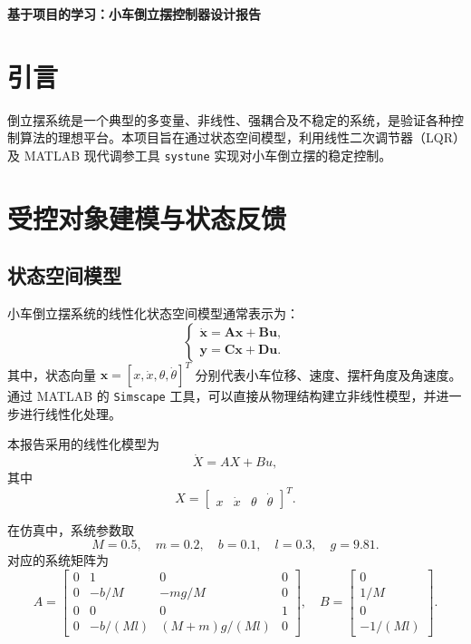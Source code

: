 \documentclass[11pt]{article}
\begin{document}
\begin{center}
    \huge \textbf{基于项目的学习：小车倒立摆控制器设计报告}
\end{center}

\section{引言}
倒立摆系统是一个典型的多变量、非线性、强耦合及不稳定的系统，是验证各种控制算法的理想平台。本项目旨在通过状态空间模型，利用线性二次调节器（LQR）及 MATLAB 现代调参工具 \texttt{systune} 实现对小车倒立摆的稳定控制。

\section{受控对象建模与状态反馈}

\subsection{状态空间模型}
小车倒立摆系统的线性化状态空间模型通常表示为：
\begin{equation}
    \begin{cases}
        \bm{\dot{x}} = \bm{A}\bm{x} + \bm{B}\bm{u}, \\
        \bm{y} = \bm{C}\bm{x} + \bm{D}\bm{u}.
    \end{cases}
\end{equation}
其中，状态向量 $\bm{x} = [x, \dot{x}, \theta, \dot{\theta}]^T$ 分别代表小车位移、速度、摆杆角度及角速度。通过 MATLAB 的 \texttt{Simscape} 工具，可以直接从物理结构建立非线性模型，并进一步进行线性化处理。

本报告采用的线性化模型为
\begin{equation}
\dot{X}=AX+Bu,
\end{equation}
其中
\begin{equation}
X=
\begin{bmatrix}
 x & \dot{x} & \theta & \dot{\theta}
\end{bmatrix}^T.
\end{equation}

在仿真中，系统参数取
\begin{equation}
M=0.5,\quad m=0.2,\quad b=0.1,\quad l=0.3,\quad g=9.81.
\end{equation}
对应的系统矩阵为
\begin{equation}
A=
\begin{bmatrix}
0 & 1 & 0 & 0\\
0 & -b/M & -mg/M & 0\\
0 & 0 & 0 & 1\\
0 & -b/(Ml) & (M+m)g/(Ml) & 0
\end{bmatrix},
\quad
B=
\begin{bmatrix}
0\\
1/M\\
0\\
-1/(Ml)
\end{bmatrix}.
\end{equation}
\end{document}
